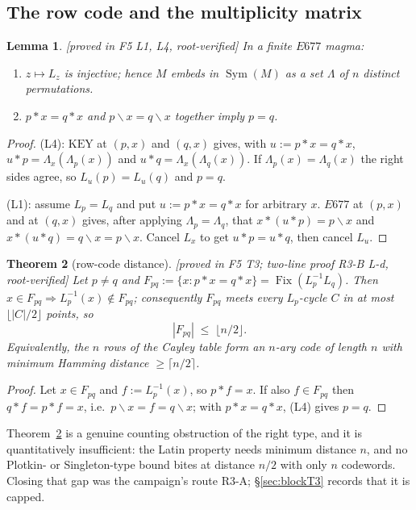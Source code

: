 \documentclass[11pt]{article}
\theoremstyle{plain}
\newtheorem{theorem}{Theorem}[section]
\newtheorem{lemma}[theorem]{Lemma}
\theoremstyle{definition}
\theoremstyle{remark}
\numberwithin{equation}{section}
\newcommand{\op}{\mathbin{*}}
\newcommand{\Fix}{\operatorname{Fix}}
\newcommand{\Sym}{\operatorname{Sym}}
\newcommand{\statusbox}[1]{{\small\sloppy\textsf{[#1]}}}
\newcommand{\PROVED}[1]{\statusbox{proved in #1, root-verified}}
\begin{document}
\subsection{The row code and the multiplicity matrix}

\begin{lemma}\label{lem:L1L4}
\PROVED{F5 L1, L4}
In a finite $E677$ magma:
\begin{enumerate}
\item[(L1)] $z\mapsto L_z$ is injective; hence $M$ embeds in $\Sym(M)$ as a set $\Lambda$ of
$n$ distinct permutations.
\item[(L4)] $p\op x = q\op x$ \emph{and} $p\backslash x = q\backslash x$ together imply
$p = q$.
\end{enumerate}
\end{lemma}

\begin{proof}
(L4): $\mathrm{KEY}$ at $(p,x)$ and $(q,x)$ gives, with $u := p\op x = q\op x$,
$u\op p = \Lambda_x(\Lambda_p(x))$ and $u\op q = \Lambda_x(\Lambda_q(x))$. If
$\Lambda_p(x) = \Lambda_q(x)$ the right sides agree, so $L_u(p) = L_u(q)$ and $p=q$.

(L1): assume $L_p = L_q$ and put $u := p\op x = q\op x$ for arbitrary $x$. $E677$ at $(p,x)$
and at $(q,x)$ gives, after applying $\Lambda_p = \Lambda_q$, that
$x\op(u\op p) = p\backslash x$ and $x\op(u\op q) = q\backslash x = p\backslash x$. Cancel
$L_x$ to get $u\op p = u\op q$, then cancel $L_u$.
\end{proof}

\begin{theorem}[row-code distance]\label{thm:T3}
\PROVED{F5 T3; two-line proof R3-B L-d}
Let $p\ne q$ and $F_{pq} := \{x : p\op x = q\op x\} = \Fix(L_p^{-1}L_q)$. Then
$x\in F_{pq} \Rightarrow L_p^{-1}(x)\notin F_{pq}$; consequently $F_{pq}$ meets every
$L_p$-cycle $C$ in at most $\lfloor |C|/2\rfloor$ points, so
\[
  |F_{pq}| \;\le\; \lfloor n/2\rfloor .
\]
Equivalently, the $n$ rows of the Cayley table form an $n$-ary code of length $n$ with
minimum Hamming distance $\ge \lceil n/2\rceil$.
\end{theorem}

\begin{proof}
Let $x\in F_{pq}$ and $f := L_p^{-1}(x)$, so $p\op f = x$. If also $f\in F_{pq}$ then
$q\op f = p\op f = x$, i.e.\ $p\backslash x = f = q\backslash x$; with $p\op x = q\op x$,
(L4) gives $p = q$.
\end{proof}

Theorem~\ref{thm:T3} is a genuine counting obstruction of the right type, and it is
quantitatively insufficient: the Latin property needs minimum distance $n$, and no
Plotkin- or Singleton-type bound bites at distance $n/2$ with only $n$ codewords. Closing
that gap was the campaign's route R3-A; \S\ref{sec:blockT3} records that it is capped.
\end{document}
